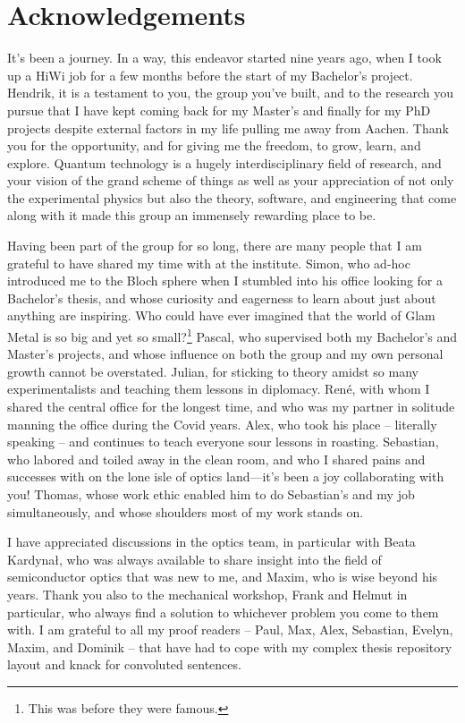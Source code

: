 \chapter*{Acknowledgements}
It's been a journey.
In a way, this endeavor started nine years ago, when I took up a HiWi job for a few months before the start of my Bachelor's project.
Hendrik, it is a testament to you, the group you've built, and to the research you pursue that I have kept coming back for my Master's and finally for my PhD projects despite external factors in my life pulling me away from Aachen.
Thank you for the opportunity, and for giving me the freedom, to grow, learn, and explore.
Quantum technology is a hugely interdisciplinary field of research, and your vision of the grand scheme of things as well as your appreciation of not only the experimental physics but also the theory, software, and engineering that come along with it made this group an immensely rewarding place to be.

Having been part of the group for so long, there are many people that I am grateful to have shared my time with at the institute.
Simon, who ad-hoc introduced me to the Bloch sphere when I stumbled into his office looking for a Bachelor's thesis, and whose curiosity and eagerness to learn about just about anything are inspiring.
Who could have ever imagined that the world of Glam Metal is so big and yet so small?\footnote{
    This was before they were famous.
}
Pascal, who supervised both my Bachelor's and Master's projects, and whose influence on both the group and my own personal growth cannot be overstated.
Julian, for sticking to theory amidst so many experimentalists and teaching them lessons in diplomacy.
René, with whom I shared the central office for the longest time, and who was my partner in solitude manning the office during the Covid years.
Alex, who took his place -- literally speaking -- and continues to teach everyone sour lessons in roasting.
Sebastian, who labored and toiled away in the clean room, and who I shared pains and successes with on the lone isle of optics land---it's been a joy collaborating with you!
Thomas, whose work ethic enabled him to do Sebastian's and my job simultaneously, and whose shoulders most of my work stands on.

I have appreciated discussions in the optics team, in particular with Beata Kardynał, who was always available to share insight into the field of semiconductor optics that was new to me, and Maxim, who is wise beyond his years.
Thank you also to the mechanical workshop, Frank and Helmut in particular, who always find a solution to whichever problem you come to them with.
I am grateful to all my proof readers -- Paul, Max, Alex, Sebastian, Evelyn, Maxim, and Dominik -- that have had to cope with my complex thesis repository layout and knack for convoluted sentences.

